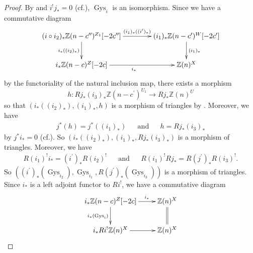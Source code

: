 \documentclass{article}
\begin{document}
%
\begin{proof}\upshape
By \cite[p.780, Corollary 3.3.a)]{Ge} and 
$i^{!}j_{*}=0$ (cf.\cite[p.76, II, Proposition 3.14 (c)]{M}),
$\operatorname{Gys}_{i}$ is an isomorphism.
Since we have a commutative diagram
%
\begin{equation*}
\xymatrix@C=40pt{
(i\circ i_{2})_{*}\mathbb{Z}(n-c^{\prime\prime})^{Z_{1}}[-2c^{\prime\prime}]
\ar[r]^-{(i_{1})_{*}((i^{\prime})_{*})}
\ar[d]_{i_{*}((i_{2})_{*})}
&
(i_{1})_{*}\mathbb{Z}(n-c^{\prime})^{W}[-2c^{\prime}]
\ar[d]^{(i_{1})_{*}}
\\
i_{*}\mathbb{Z}(n-c)^{Z}[-2c]
\ar[r]_{i_{*}}
&
\mathbb{Z}(n)^{X}
}    
\end{equation*}
%
by the functoriality of the natural inclusion map,
there exists a morphism
%
\begin{equation*}
h: Rj_{*}(i_{3})_{*}\mathbb{Z}(n-c^{\prime})^{U_{1}}
\to
Rj_{*}\mathbb{Z}(n)^{U}
\end{equation*}
%
so that
%
\begin{math}
\left(
i_{*}((i_{2})_{*}),
(i_{1})_{*},
h
\right)
\end{math}
%
is a morphism of triangles
by \cite[p.780, Corollary 3.3.a)]{Ge}. 
Moreover, we have
%
\begin{align*}
j^{*}(h)=j^{*}((i_{1})_{*})
&&
\textrm{and}
&&
h=Rj_{*}(i_{3})_{*}
\end{align*}
%
by $j^{*}i_{*}=0$ (cf.\cite[p.76, II, Proposition 3.14 (c)]{M}). 
So
%
\begin{math}
\left( 
i_{*}((i_{2})_{*}),
(i_{1})_{*},
Rj_{*}(i_{3})_{*}
\right)
\end{math}
%
is a morphism of triangles. Moreover, we have
%
\begin{align*}
R(i_{1})^{!}i_{*} 
=(i^{\prime})_{*}R(i_{2})^{!}
&&
\textrm{and}
&&
R(i_{1})^{!}Rj_{*}
=R(j^{\prime})_{*}R(i_{3})^{!}.
\end{align*}
%
So 
%
\begin{math}
\left( 
(i^{\prime})_{*}(\operatorname{Gys}_{i_{2}}),
\operatorname{Gys}_{i_{1}},
R(j^{\prime})_{*}(\operatorname{Gys}_{i_{3}})
\right)
\end{math}
%
is a morphism of triangles.
Since $i_{*}$ is a left adjoint functor
to $Ri^{!}$, we have a commutative diagram
%
\begin{equation*}
\xymatrix{
i_{*}\mathbb{Z}(n-c)^{Z}[-2c]
\ar[r]^-{i_{*}}
\ar[d]_{i_{*}(\operatorname{Gys}_{i})}
&
\mathbb{Z}(n)^{X} 
\ar@{=}[d]
\\
i_{*}Ri^{!}\mathbb{Z}(n)^{X}
\ar[r]
&
\mathbb{Z}(n)^{X}
}    
\end{equation*}

\end{proof}
\end{document}
